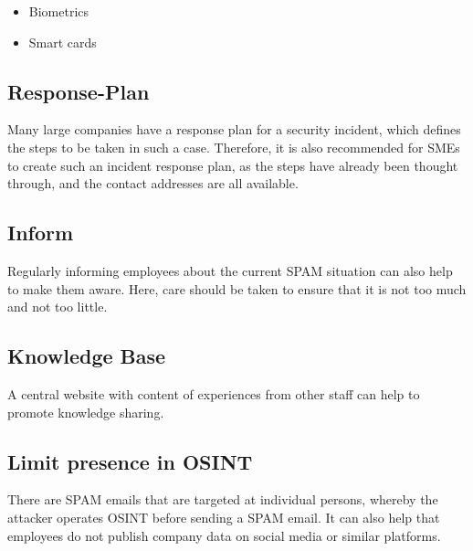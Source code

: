 \begin{itemize}
    \item Biometrics
    \item Smart cards
\end{itemize}

\subsection{Response-Plan}
Many large companies have a response plan for a security incident, which defines the steps to be taken in such a case.
Therefore, it is also recommended for SMEs to create such an incident response plan, as the steps have already been thought through, and the contact addresses are all available.

\subsection{Inform}
Regularly informing employees about the current SPAM situation can also help to make them aware.
Here, care should be taken to ensure that it is not too much and not too little.

\subsection{Knowledge Base}
A central website with content of experiences from other staff can help to promote knowledge sharing.

\subsection{Limit presence in OSINT}
There are SPAM emails that are targeted at individual persons, whereby the attacker operates OSINT before sending a SPAM email.
It can also help that employees do not publish company data on social media or similar platforms.

